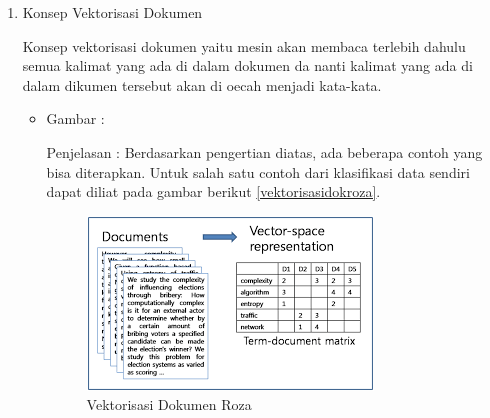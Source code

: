 \begin{enumerate}
\item Konsep Vektorisasi Dokumen 
\par Konsep vektorisasi dokumen yaitu mesin akan membaca terlebih dahulu semua kalimat yang ada di dalam dokumen da nanti kalimat yang ada di dalam dikumen tersebut akan di oecah menjadi kata-kata.
\par
\begin{itemize}
\item Gambar :
\par Penjelasan : Berdasarkan pengertian diatas, ada beberapa contoh yang bisa diterapkan. Untuk salah satu contoh dari klasifikasi data sendiri dapat diliat pada gambar berikut \ref{vektorisasidokroza}.
\begin{figure}[!hbtp]
\centering
\includegraphics[scale=0.3]{figures/vektorisasidokroza.png}
\caption{Vektorisasi Dokumen Roza}
\label{text-fadila}
\end{figure}
\end{itemize}


\end{enumerate}
